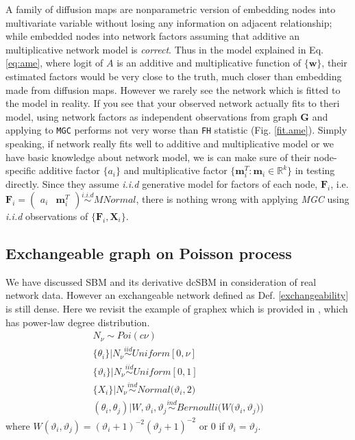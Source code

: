 \documentclass[12pt]{article}
\theoremstyle{definition}
\begin{document}
A family of diffusion maps are nonparametric version of embedding nodes into multivariate variable without losing any information on adjacent relationship; while \cite{fosdick2015testing} embedded nodes into network factors assuming that additive an multiplicative network model is \textit{correct}. Thus in the model explained in Eq. \ref{eq:ame}, where logit of $A$ is an additive and multiplicative function of $\{\mathbf{w} \}$, their estimated factors would be very close to the truth, much closer than embedding made from diffusion maps. However we rarely see the network which is fitted to the model in reality. If you see that your observed network actually fits to theri model, using network factors as independent observations from graph $\mathbf{G}$ and applying to \texttt{MGC} performs not very worse than \texttt{FH} statistic (Fig. \ref{fit.ame}).
Simply speaking, if network really fits well to additive and multiplicative model or we have basic knowledge about network model, we is can make sure of their node-specific additive factor $\{ a_{i} \}$ and multiplicative factor $\{ \mathbf{m}^{T}_{i} : \mathbf{m}_{i} \in \mathbb{R}^{k} \}$ in testing directly. Since they assume \textit{i.i.d} generative model for factors of each node, $\mathbf{F}_{i}$, i.e. $\mathbf{F}_{i} = \begin{pmatrix} a_{i} & \mathbf{m}^{T}_{i} \end{pmatrix} \overset{i.i.d}{\sim} MNormal$, there is nothing wrong with applying \textit{MGC} using \textit{i.i.d} observations of $\{ \mathbf{F}_{i}, \mathbf{X}_{i} \}$.   
	


\subsection{Exchangeable graph on Poisson process}

We have discussed SBM and its derivative dcSBM in consideration of real network data. However an exchangeable network defined as Def. \ref{exchangeability} is still dense. Here we revisit the example of graphex which is provided in \cite{veitch2015class}, which has power-law degree distribution.
\begin{equation}
\begin{gathered}
N_{\nu} \sim Poi( c \nu) \\ 
\{ \theta_{i} \} \big| N_{\nu} \overset{iid}{\sim} Uniform[0, \nu]  \\ 
\{ \vartheta_{i} \} \big| N_{\nu} \overset{iid}{\sim} Uniform[0,1] \\ 
\{ X_{i}  \} | N_{\nu} \overset{ind}{\sim} Normal \big( \vartheta_{i}, 2 \big)  \\ 
(\theta_{i}, \theta_{j}) \big| W, \vartheta_{i}, \vartheta_{j} \overset{ind}{\sim} Bernoulli \big( W\big( \vartheta_{i}, \vartheta_{j} \big) \big) 
\end{gathered}
\end{equation}
where $W(\vartheta_{i}, \vartheta_{j} ) = (\vartheta_{i} + 1)^{-2} ( \vartheta_{j} + 1 )^{-2}$ or 0 if $\vartheta_{i} = \vartheta_{j}$. 
\end{document}
